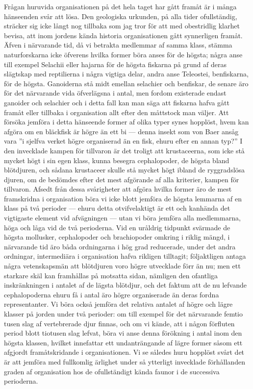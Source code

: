 Frågan huruvida organisationen på det hela taget har gått framåt är i många hänseenden svår att lösa. Den geologiska urkunden, på alla tider ofullständig, sträcker sig icke långt nog tillbaka som jag tror för att med obestridlig klarhet bevisa, att inom jordens kända historia organisationen gått synnerligen framåt. Äfven i närvarande tid, då vi betrakta medlemmar af samma klass, stämma naturforskarna icke öfverens hvilka former böra anses för de högsta; några anse till exempel Selachii eller hajarna för de högsta fiskarna på grund af deras slägtskap med reptilierna i några vigtiga delar, andra anse Teleostei, benfiskarna, för de högsta. Ganoiderna stå midt emellan selachier och benfiskar, de senare äro för det närvarande vida öfverlägsna i antal, men fordom existerade endast ganoider och selachier och i detta fall kan man säga att fiskarna hafva gått framåt eller tillbaka i organisation allt efter den måttstock man väljer. Att försöka jemföra i detta hänseende former af olika typer synes hopplöst, hvem kan afgöra om en bläckfisk är högre än ett bi — denna insekt som von Baer ansåg vara ”i sjelfva verket högre organiserad än en fisk, ehuru efter en annan typ?” I den invecklade kampen för tillvaron är det troligt att krustaceerna, som icke stå mycket högt i sin egen klass, kunna besegra cephalopoder, de högsta bland blötdjuren, och sådana krustaceer skulle stå mycket högt ibland de ryggradslösa djuren, om de bedömdes efter det mest afgörande af alla kriterier, kampen för tillvaron. Afsedt från dessa svårigheter att afgöra hvilka former äro de mest framskridna i organisation böra vi icke blott jemföra de högsta lemmarna af en klass på två perioder — ehuru detta otvifvelaktigt är ett och kanhända det vigtigaste element vid afvägningen — utan vi böra jemföra alla medlemmarna, höga och låga vid de två perioderna. Vid en uråldrig tidpunkt svärmade de högsta mollusker, cephalopoder och brachiopoder omkring i riklig mängd, i närvarande tid äro båda ordningarna i hög grad reducerade, under det andra ordningar, intermediära i organisation hafva rikligen tilltagit; följaktligen antaga några vetenskapsmän att blötdjuren voro högre utvecklade förr än nu; men ett starkare skäl kan framhållas på motsatta sidan, nämligen den ofantliga inskränkningen i antalet af de lägsta blötdjur, och det faktum att de nu lefvande cephalopoderna ehuru få i antal äro högre organiserade än deras fordna representanter. Vi böra också jemföra det relativa antalet af högre och lägre klasser på jorden under två perioder: om till exempel för det närvarande femtio tusen slag af vertebrerade djur finnas, och om vi kände, att i någon förfluten period blott tiotusen slag lefvat, böra vi anse denna förökning i antal inom den högsta klassen, hvilket innefattar ett undanträngande af lägre former såsom ett afgjordt framåtskridande i organisationen. Vi se således huru hopplöst svårt det är att jemföra med fullkomlig ärlighet under så ytterligt invecklade förhållanden graden af organisation hos de ofullständigt kända faunor i de successiva perioderna.

